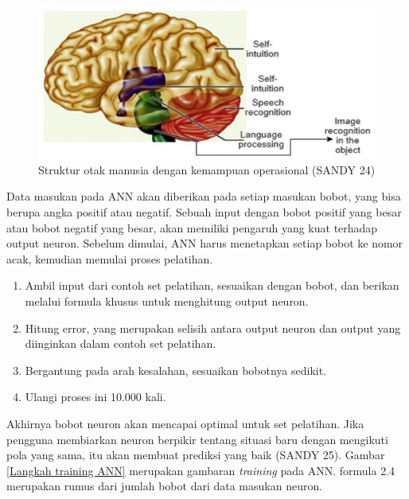 \begin{figure}[H]
	\vspace{-0.1cm}
	\begin{center}
		\includegraphics[width=0.9\columnwidth]{bab2/Gambar/Struktur otak manusia dengan kemampuan operasional.jpg}
	\end{center}
	\vspace{-0.2cm}
	\caption{Struktur otak manusia dengan kemampuan operasional (SANDY 24)}\label{Struktur otak manusia dengan kemampuan operasional}
\end{figure}

Data masukan pada ANN akan diberikan pada setiap masukan bobot, yang bisa berupa angka positif atau negatif. Sebuah input dengan bobot positif yang besar atau bobot negatif yang besar, akan memiliki pengaruh yang kuat terhadap output neuron. Sebelum dimulai, ANN harus menetapkan setiap bobot ke nomor acak, kemudian memulai proses pelatihan.

\begin{enumerate}
	\item Ambil input dari contoh set pelatihan, sesuaikan dengan bobot, dan berikan melalui formula khusus untuk menghitung output neuron. 
	\item 	Hitung error, yang merupakan selisih antara output neuron dan output yang diinginkan dalam contoh set pelatihan. 
	\item Bergantung pada arah kesalahan, sesuaikan bobotnya sedikit.
	\item Ulangi proses ini 10.000 kali.
\end{enumerate}

Akhirnya bobot neuron akan mencapai optimal untuk set pelatihan. Jika pengguna membiarkan neuron berpikir tentang situasi baru dengan mengikuti pola yang sama, itu akan membuat prediksi yang baik (SANDY 25). Gambar \ref{Langkah training ANN} merupakan gambaran \textit{training} pada ANN. formula 2.4 merupakan rumus dari jumlah bobot dari data masukan neuron. 

